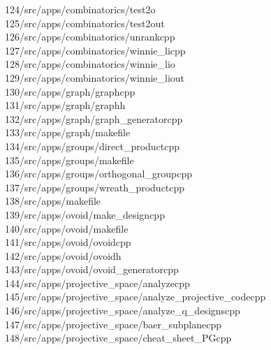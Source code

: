 \begin{tabbing}
124\>/src/apps/combinatorics/test2o\\[0pt]
125\>/src/apps/combinatorics/test2out\\[0pt]
126\>/src/apps/combinatorics/unrankcpp\\[0pt]
127\>/src/apps/combinatorics/winnie\_licpp\\[0pt]
128\>/src/apps/combinatorics/winnie\_lio\\[0pt]
129\>/src/apps/combinatorics/winnie\_liout\\[0pt]
130\>/src/apps/graph/graphcpp\\[0pt]
131\>/src/apps/graph/graphh\\[0pt]
132\>/src/apps/graph/graph\_generatorcpp\\[0pt]
133\>/src/apps/graph/makefile\\[0pt]
134\>/src/apps/groups/direct\_productcpp\\[0pt]
135\>/src/apps/groups/makefile\\[0pt]
136\>/src/apps/groups/orthogonal\_groupcpp\\[0pt]
137\>/src/apps/groups/wreath\_productcpp\\[0pt]
138\>/src/apps/makefile\\[0pt]
139\>/src/apps/ovoid/make\_designcpp\\[0pt]
140\>/src/apps/ovoid/makefile\\[0pt]
141\>/src/apps/ovoid/ovoidcpp\\[0pt]
142\>/src/apps/ovoid/ovoidh\\[0pt]
143\>/src/apps/ovoid/ovoid\_generatorcpp\\[0pt]
144\>/src/apps/projective\_space/analyzecpp\\[0pt]
145\>/src/apps/projective\_space/analyze\_projective\_codecpp\\[0pt]
146\>/src/apps/projective\_space/analyze\_q\_designscpp\\[0pt]
147\>/src/apps/projective\_space/baer\_subplanecpp\\[0pt]
148\>/src/apps/projective\_space/cheat\_sheet\_PGcpp\\[0pt]

\end{tabbing}
